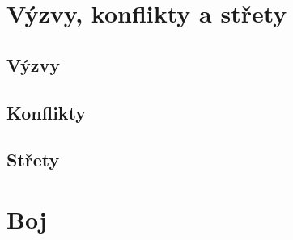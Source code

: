 \documentclass[../main.tex]{subfiles}
\begin{document}
\section{Výzvy, konflikty a střety}
\label{sec:vyzvykonflikty}

\subsection{Výzvy}
\label{sec:vyzvy}

\subsection{Konflikty}
\label{sec:konflikty}

\subsection{Střety}
\label{sec:strety}

\section{Boj}
\label{sec:boj}
\end{document}
